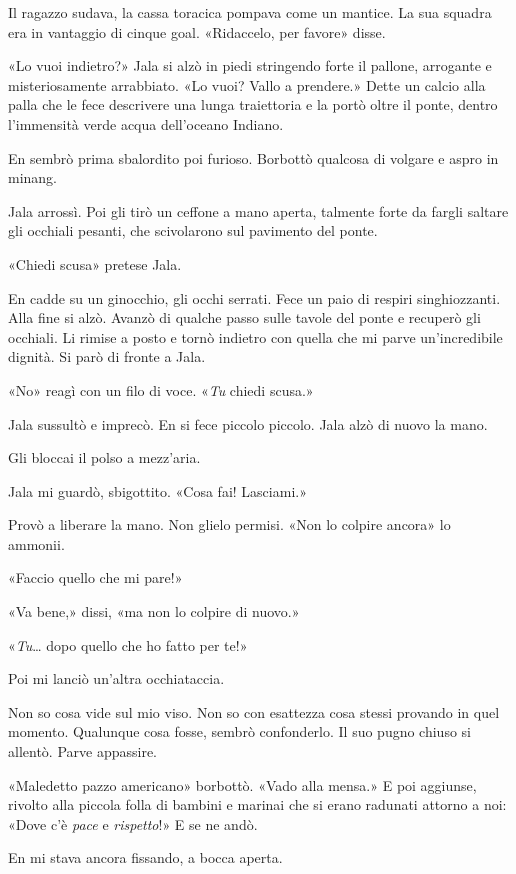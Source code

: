 Il ragazzo sudava, la cassa toracica pompava come un mantice. La sua
squadra era in vantaggio di cinque goal. «Ridaccelo, per favore» disse.

«Lo vuoi indietro?» Jala si alzò in piedi stringendo forte il pallone,
arrogante e misteriosamente arrabbiato. «Lo vuoi? Vallo a prendere.»
Dette un calcio alla palla che le fece descrivere una lunga traiettoria
e la portò oltre il ponte, dentro l'immensità verde acqua dell'oceano
Indiano.

En sembrò prima sbalordito poi furioso. Borbottò qualcosa di volgare e
aspro in minang.

Jala arrossì. Poi gli tirò un ceffone a mano aperta, talmente forte da
fargli saltare gli occhiali pesanti, che scivolarono sul pavimento del
ponte.

«Chiedi scusa» pretese Jala.

En cadde su un ginocchio, gli occhi serrati. Fece un paio di respiri
singhiozzanti. Alla fine si alzò. Avanzò di qualche passo sulle tavole
del ponte e recuperò gli occhiali. Li rimise a posto e tornò indietro
con quella che mi parve un'incredibile dignità. Si parò di fronte a
Jala.

«No» reagì con un filo di voce. «\emph{Tu} chiedi scusa.»

Jala sussultò e imprecò. En si fece piccolo piccolo. Jala alzò di nuovo
la mano.

Gli bloccai il polso a mezz'aria.

Jala mi guardò, sbigottito. «Cosa fai! Lasciami.»

Provò a liberare la mano. Non glielo permisi. «Non lo colpire ancora» lo
ammonii.

«Faccio quello che mi pare!»

«Va bene,» dissi, «ma non lo colpire di nuovo.»

«\emph{Tu}\ldots{} dopo quello che ho fatto per te!»

Poi mi lanciò un'altra occhiataccia.

Non so cosa vide sul mio viso. Non so con esattezza cosa stessi provando
in quel momento. Qualunque cosa fosse, sembrò confonderlo. Il suo pugno
chiuso si allentò. Parve appassire.

«Maledetto pazzo americano» borbottò. «Vado alla mensa.» E poi aggiunse,
rivolto alla piccola folla di bambini e marinai che si erano radunati
attorno a noi: «Dove c'è \emph{pace} e \emph{rispetto}!» E se ne andò.

En mi stava ancora fissando, a bocca aperta.

